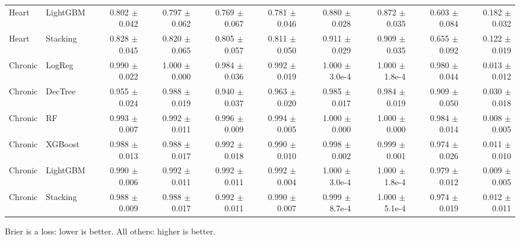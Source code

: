 \begin{table}[t]
{\begin{tabular}{llrrrrrrrr}
Heart & LightGBM & 0.802 $\pm$ 0.042 & 0.797 $\pm$ 0.062 & 0.769 $\pm$ 0.067 & 0.781 $\pm$ 0.046 & 0.880 $\pm$ 0.028 & 0.872 $\pm$ 0.035 & 0.603 $\pm$ 0.084 & 0.182 $\pm$ 0.032 \\
Heart & Stacking & 0.828 $\pm$ 0.045 & 0.820 $\pm$ 0.065 & 0.805 $\pm$ 0.057 & 0.811 $\pm$ 0.050 & 0.911 $\pm$ 0.029 & 0.909 $\pm$ 0.035 & 0.655 $\pm$ 0.092 & 0.122 $\pm$ 0.019 \\
Chronic & LogReg & 0.990 $\pm$ 0.022 & 1.000 $\pm$ 0.000 & 0.984 $\pm$ 0.036 & 0.992 $\pm$ 0.019 & 1.000 $\pm$ 3.0e-4 & 1.000 $\pm$ 1.8e-4 & 0.980 $\pm$ 0.044 & 0.013 $\pm$ 0.012 \\
Chronic & DecTree & 0.955 $\pm$ 0.024 & 0.988 $\pm$ 0.019 & 0.940 $\pm$ 0.037 & 0.963 $\pm$ 0.020 & 0.985 $\pm$ 0.017 & 0.984 $\pm$ 0.019 & 0.909 $\pm$ 0.050 & 0.030 $\pm$ 0.018 \\
Chronic & RF & 0.993 $\pm$ 0.007 & 0.992 $\pm$ 0.011 & 0.996 $\pm$ 0.009 & 0.994 $\pm$ 0.005 & 1.000 $\pm$ 0.000 & 1.000 $\pm$ 0.000 & 0.984 $\pm$ 0.014 & 0.008 $\pm$ 0.005 \\
Chronic & XGBoost & 0.988 $\pm$ 0.013 & 0.988 $\pm$ 0.017 & 0.992 $\pm$ 0.018 & 0.990 $\pm$ 0.010 & 0.998 $\pm$ 0.002 & 0.999 $\pm$ 0.001 & 0.974 $\pm$ 0.026 & 0.011 $\pm$ 0.010 \\
Chronic & LightGBM & 0.990 $\pm$ 0.006 & 0.992 $\pm$ 0.011 & 0.992 $\pm$ 0.011 & 0.992 $\pm$ 0.004 & 1.000 $\pm$ 3.0e-4 & 1.000 $\pm$ 1.8e-4 & 0.979 $\pm$ 0.012 & 0.009 $\pm$ 0.005 \\
Chronic & Stacking & 0.988 $\pm$ 0.009 & 0.988 $\pm$ 0.017 & 0.992 $\pm$ 0.011 & 0.990 $\pm$ 0.007 & 0.999 $\pm$ 8.7e-4 & 1.000 $\pm$ 5.1e-4 & 0.974 $\pm$ 0.019 & 0.012 $\pm$ 0.011 \\
\bottomrule
\end{tabular}
}
\par\vspace{2pt}\footnotesize Brier is a loss: lower is better. All others: higher is better.
\end{table}
